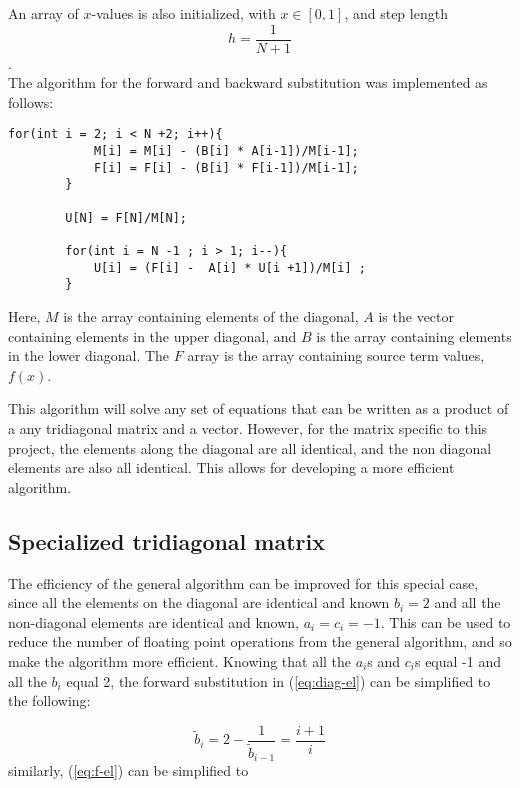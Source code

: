 \documentclass[12pt]{article}
\begin{document}
\noindent  An array of $x$-values is also initialized, with $x\in[0,1]$, and step length $$h=\frac{1}{N+1}$$. \\

\noindent The algorithm for the forward and backward substitution was implemented as follows: 
\begin{lstlisting}[frame=single]
  for(int i = 2; i < N +2; i++){
            M[i] = M[i] - (B[i] * A[i-1])/M[i-1];
            F[i] = F[i] - (B[i] * F[i-1])/M[i-1];
        }
 
        U[N] = F[N]/M[N];
 
        for(int i = N -1 ; i > 1; i--){
            U[i] = (F[i] -  A[i] * U[i +1])/M[i] ;
        }
\end{lstlisting}

\noindent  Here, $M$ is the array containing elements of the diagonal, $A$ is the vector containing  elements in the upper diagonal, and $B$ is the array containing  elements in the lower diagonal. The $F$ array is the array containing source term values, $f(x)$.

\noindent This algorithm will solve any set of equations that can be written as a product of a any tridiagonal matrix and a vector. However, for the matrix specific to this project, the elements along the diagonal are all identical, and the non diagonal elements are also all identical. This allows for developing a more efficient algorithm. 


\subsection{Specialized tridiagonal matrix}

The efficiency of the general algorithm can be improved for this special case, since all the elements on the diagonal are identical and known $b_i =2$ and all the non-diagonal elements are identical and known, $a_i = c_i =-1$. 
This can be used to reduce the number of floating point operations from the general algorithm, and so make the algorithm more efficient.
Knowing that all the $a_i$s and $c_i$s equal -1 and all the $b_i$ equal 2, the forward substitution in  (\ref{eq:diag-el}) can be simplified to the following:

\begin{equation}
\tilde{b}_i = 2-\frac{1}{\tilde{b}_{i-1}}=\frac{i+1}{i}
\end{equation}
similarly, (\ref{eq:f-el}) can be simplified to 
\begin{equation}

\end{equation}
\end{document}

